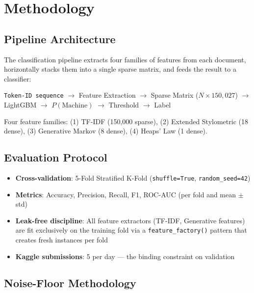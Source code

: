 \documentclass[11pt]{article}
\begin{document}
\section{Methodology}

\subsection{Pipeline Architecture}

The classification pipeline extracts four families of features from each document, horizontally stacks them into a single sparse matrix, and feeds the result to a classifier:

\begin{center}
\small
\texttt{Token-ID sequence} $\to$ Feature Extraction $\to$ Sparse Matrix ($N \times 150{,}027$) $\to$ LightGBM $\to$ $P(\text{Machine})$ $\to$ Threshold $\to$ Label
\end{center}

Four feature families: (1) TF-IDF (150,000 sparse), (2) Extended Stylometric (18 dense), (3) Generative Markov (8 dense), (4) Heaps' Law (1 dense).

\subsection{Evaluation Protocol}

\begin{itemize}
    \item \textbf{Cross-validation}: 5-Fold Stratified K-Fold (\texttt{shuffle=True}, \texttt{random\_seed=42})
    \item \textbf{Metrics}: Accuracy, Precision, Recall, F1, ROC-AUC (per fold and mean $\pm$ std)
    \item \textbf{Leak-free discipline}: All feature extractors (TF-IDF, Generative features) are fit exclusively on the training fold via a \texttt{feature\_factory()} pattern that creates fresh instances per fold
    \item \textbf{Kaggle submissions}: 5 per day --- the binding constraint on validation
\end{itemize}

\subsection{Noise-Floor Methodology}
\label{sec:noisefloor}
\end{document}
